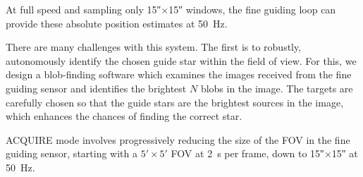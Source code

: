 At full speed and sampling only \ang{;;15}$\times$\ang{;;15} windows, the fine guiding loop can provide these absolute position estimates at \SI{50}{\hertz}. 

There are many challenges with this system. The first is to robustly, autonomously identify the chosen guide star within the field of view. For this, we design a blob-finding software which examines the images received from the fine guiding sensor and identifies the brightest $N$ blobs in the image. The targets are carefully chosen so that the guide stars are the brightest sources in the image, which enhances the chances of finding the correct star. 

ACQUIRE mode involves progressively reducing the size of the FOV in the fine guiding sensor, starting with a $\ang{;5;}\times\ang{;5;}$ FOV at \SI{2}{\second} per frame, down to \ang{;;15}$\times$\ang{;;15} at \SI{50}{\hertz}. 

